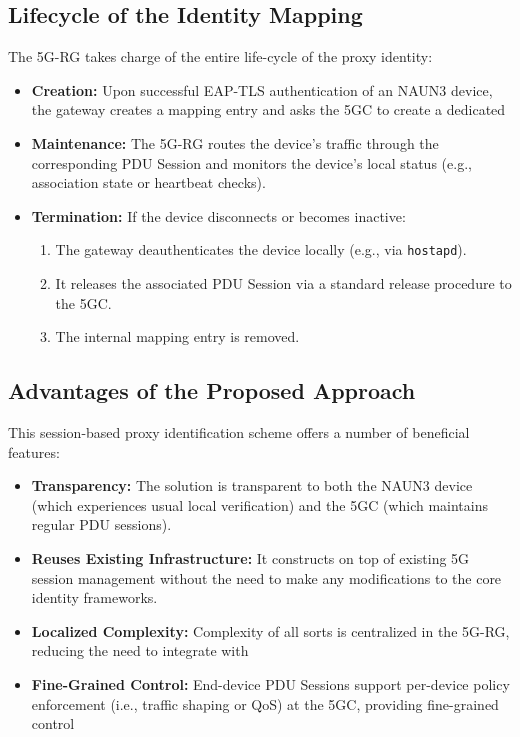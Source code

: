 \subsection{Lifecycle of the Identity Mapping}

The \ac{5G-RG} takes charge of the entire life-cycle of the proxy identity:

\begin{itemize}
    \item \textbf{Creation:} Upon successful \ac{EAP-TLS} authentication of an \ac{NAUN3} device, the gateway creates a mapping entry and asks the \ac{5GC} to create a dedicated
    
    \item \textbf{Maintenance:} The \ac{5G-RG} routes the device’s traffic through the corresponding \ac{PDU} Session and monitors the device’s local status (e.g., association state or heartbeat checks).

    \item {
        \textbf{Termination:} If the device disconnects or becomes inactive:
        \begin{enumerate}
            \item The gateway deauthenticates the device locally (e.g., via \texttt{hostapd}).
            \item It releases the associated \ac{PDU} Session via a standard release procedure to the \ac{5GC}.
            \item The internal mapping entry is removed.
        \end{enumerate}
    }
\end{itemize}

\subsection{Advantages of the Proposed Approach}

This session-based proxy identification scheme offers a number of beneficial features:

\begin{itemize}
    \item \textbf{Transparency:} The solution is transparent to both the \ac{NAUN3} device (which experiences usual local verification) and the \ac{5GC} (which maintains regular \ac{PDU} sessions).
    \item \textbf{Reuses Existing Infrastructure:} It constructs on top of existing \ac{5G} session management without the need to make any modifications to the core identity frameworks.

    \item \textbf{Localized Complexity:} Complexity of all sorts is centralized in the \ac{5G-RG}, reducing the need to integrate with
    
    \item \textbf{Fine-Grained Control:} End-device \ac{PDU} Sessions support per-device policy enforcement (i.e., traffic shaping or QoS) at the \ac{5GC}, providing fine-grained control
\end{itemize}

